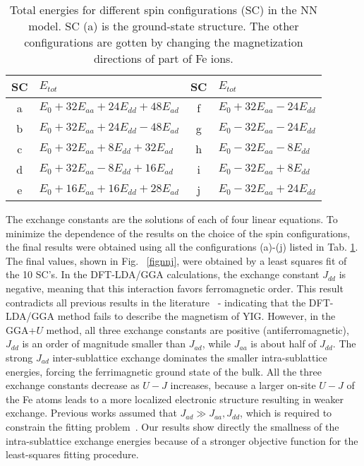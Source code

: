 \documentclass[aps,pre,reprint,superscriptaddress,longbibliography]{revtex4-1}
\begin{document}
{\begin{table}[h]
\caption{Total energies for different spin configurations (SC) in the NN model. SC (a) is the ground-state structure. The other configurations are gotten by changing the magnetization directions of part of Fe ions.}
\begin{center}
\begin{tabular}{clcl}
\hline\hline
     SC    & $E_{tot}$   & SC    & $E_{tot}$ \\
\hline
     a     & $E_0+32E_{aa}+24E_{dd}+48E_{ad}$   & f  & $E_0+32E_{aa}-24E_{dd}$ \\
     b     & $E_0+32E_{aa}+24E_{dd}-48E_{ad}$   & g  & $E_0-32E_{aa}-24E_{dd}$ \\
     c     & $E_0+32E_{aa}+8E_{dd}+32E_{ad}$    & h  & $E_0-32E_{aa}-8E_{dd}$  \\
     d     & $E_0+32E_{aa}-8E_{dd}+16E_{ad}$    & i  & $E_0-32E_{aa}+8E_{dd}$  \\
     e     & $E_0+16E_{aa}+16E_{dd}+28E_{ad}$   & j  & $E_0-32E_{aa}+24E_{dd}$ \\            
\hline\hline
\end{tabular}
\end{center} \label{tab:etotnn}
\end{table}
        
The exchange constants are the solutions of each of four linear equations. To minimize the dependence of the results on the choice of the spin configurations, the final results were obtained using all the configurations (a)-(j) listed in Tab. \ref{tab:etotnn}. The final values, shown in Fig.~ \ref{fignnj}, were obtained by a least squares fit of the 10 SC's. In the DFT-LDA/GGA calculations, the exchange constant $J_{dd}$ is negative, meaning that this interaction favors ferromagnetic order. This result contradicts all previous results in the literature~\cite{Strenzwilk1968,Cherepanov1993} - indicating that the DFT-LDA/GGA method fails to describe the magnetism of YIG. However, in the GGA+$U$ method, all three exchange constants are positive (antiferromagnetic), $J_{dd}$ is an order of magnitude smaller than $J_{ad}$, while $J_{aa}$ is about half of $J_{dd}$. The strong $J_{ad}$ inter-sublattice exchange dominates the smaller intra-sublattice energies, forcing the ferrimagnetic ground state of the bulk. All the three exchange constants decrease as $U - J$ increases, because a larger on-site $U - J$ of the Fe atoms leads to a more localized electronic structure resulting in weaker exchange. Previous works assumed that $J_{ad} \gg J_{aa}, J_{dd}$, which is required to constrain the fitting problem~\cite{Harris1963,Strenzwilk1968,Plant1983,Cherepanov1993}. Our results show directly the smallness of the intra-sublattice exchange energies because of a stronger objective function  for the least-squares fitting procedure.

}
\end{document}
